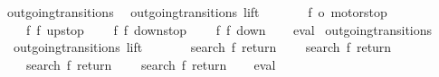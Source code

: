 \begin{isabellebody}
\ outgoing{\isacharunderscore}transitions{\isacharunderscore}{}{\isacharcolon}\isanewline
\ \ {\isachardoublequoteopen}outgoing{\isacharunderscore}transitions\ lift\ {}\ {\isacharequal}\ {\isacharbraceleft}{\isacharbar}\isanewline
\ \ \ \ {\isacharparenleft}{\isacharparenleft}f{}{\isacharcomma}\ o{}{\isacharparenright}{\isacharcomma}\ motorstop{}{\isacharparenright}{\isacharcomma}\isanewline
\ \ \ \ {\isacharparenleft}{\isacharparenleft}f{}{\isacharcomma}\ f{}{\isacharparenright}{\isacharcomma}\ up{}{}stop{\isacharparenright}{\isacharcomma}\isanewline
\ \ \ \ {\isacharparenleft}{\isacharparenleft}f{}{\isacharcomma}\ f{}{\isacharparenright}{\isacharcomma}\ down{}{}stop{\isacharparenright}{\isacharcomma}\isanewline
\ \ \ \ {\isacharparenleft}{\isacharparenleft}f{}{\isacharcomma}\ f{}{\isacharparenright}{\isacharcomma}\ down{}{}{\isacharparenright}\isanewline
{\isacharbar}{\isacharbraceright}{\isachardoublequoteclose}\isanewline
%
\isadelimproof
\ \ %
\endisadelimproof
%
\isatagproof
{}\isamarkupfalse%
\ eval%
\endisatagproof
{\isafoldproof}%
%
\isadelimproof
\isanewline
%
\endisadelimproof
\isanewline
{}\isamarkupfalse%
\ outgoing{\isacharunderscore}transitions{\isacharunderscore}{}{\isacharcolon}\isanewline
\ \ {\isachardoublequoteopen}outgoing{\isacharunderscore}transitions\ lift\ {}\ {\isacharequal}\ {\isacharbraceleft}{\isacharbar}\isanewline
\ \ \ \ {\isacharparenleft}{\isacharparenleft}search{\isacharcomma}\ f{}{\isacharparenright}{\isacharcomma}\ return{}{\isacharparenright}{\isacharcomma}\isanewline
\ \ \ \ {\isacharparenleft}{\isacharparenleft}search{\isacharcomma}\ f{}{\isacharparenright}{\isacharcomma}\ return{}{\isacharparenright}{\isacharcomma}\isanewline
\ \ \ \ {\isacharparenleft}{\isacharparenleft}search{\isacharcomma}\ f{}{\isacharparenright}{\isacharcomma}\ return{}{\isacharparenright}{\isacharcomma}\isanewline
\ \ \ \ {\isacharparenleft}{\isacharparenleft}search{\isacharcomma}\ f{}{\isacharparenright}{\isacharcomma}\ return{}{\isacharparenright}\isanewline
{\isacharbar}{\isacharbraceright}{\isachardoublequoteclose}\isanewline
%
\isadelimproof
\ \ %
\endisadelimproof
%
\isatagproof
{}\isamarkupfalse%
\ eval%
\endisatagproof
{\isafoldproof}%
%
\isadelimproof
\isanewline
%
\endisadelimproof

\end{isabellebody}
